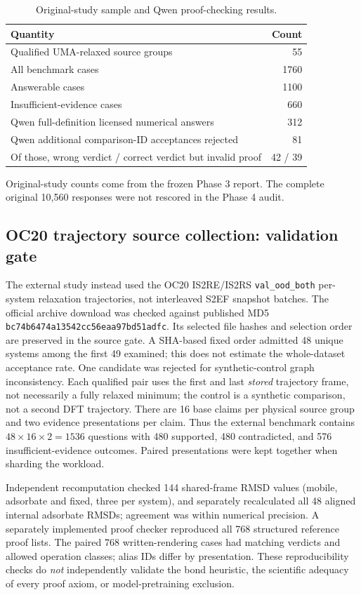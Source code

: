 \documentclass[11pt]{article}
\begin{document}
\begin{table}[htbp]\centering\small
\caption{Original-study sample and Qwen proof-checking results.}
\begin{tabular}{lr}\toprule Quantity&Count\\\midrule
Qualified UMA-relaxed source groups&55\\
All benchmark cases&1760\\
Answerable cases&1100\\
Insufficient-evidence cases&660\\
Qwen full-definition licensed numerical answers&312\\
Qwen additional comparison-ID acceptances rejected&81\\
Of those, wrong verdict / correct verdict but invalid proof&42 / 39\\
\bottomrule\end{tabular}
\end{table}

Original-study counts come from the frozen Phase 3 report. The complete original 10,560 responses were not rescored in the Phase 4 audit.

\subsection{OC20 trajectory source collection: validation gate}
The external study instead used the OC20 IS2RE/IS2RS \texttt{val\_ood\_both} per-system relaxation trajectories, not interleaved S2EF snapshot batches.\cite{chanussot2021open} The official archive download was checked against published MD5 \texttt{bc74b6474a13542cc56eaa97bd51adfc}. Its selected file hashes and selection order are preserved in the source gate. A SHA-based fixed order admitted 48 unique systems among the first 49 examined; this does not estimate the whole-dataset acceptance rate. One candidate was rejected for synthetic-control graph inconsistency. Each qualified pair uses the first and last \emph{stored} trajectory frame, not necessarily a fully relaxed minimum; the control is a synthetic comparison, not a second DFT trajectory. There are 16 base claims per physical source group and two evidence presentations per claim. Thus the external benchmark contains $48\times16\times2=1536$ questions with 480 supported, 480 contradicted, and 576 insufficient-evidence outcomes. Paired presentations were kept together when sharding the workload.

Independent recomputation checked 144 shared-frame RMSD values (mobile, adsorbate and fixed, three per system), and separately recalculated all 48 aligned internal adsorbate RMSDs; agreement was within numerical precision. A separately implemented proof checker reproduced all 768 structured reference proof lists. The paired 768 written-rendering cases had matching verdicts and allowed operation classes; alias IDs differ by presentation. These reproducibility checks do \emph{not} independently validate the bond heuristic, the scientific adequacy of every proof axiom, or model-pretraining exclusion.
\end{document}

